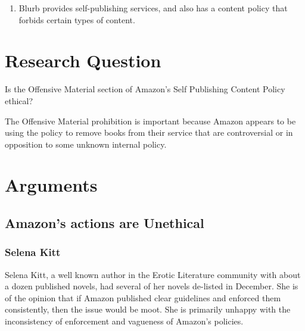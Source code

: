 \documentclass[11pt]{article}
\begin{document}
\begin{multicols}{2}
\begin{itemize}
\begin{enumerate}
   \item Blurb provides self-publishing services, and also has a content policy that forbids certain types of content. \cite{BlurbEULA}
   \end{enumerate}

\end{itemize}

\section{Research Question}

Is the Offensive Material section of Amazon's Self Publishing Content Policy ethical?

The Offensive Material prohibition is important because Amazon appears to be using the policy to remove books from their service that are controversial or in opposition to some unknown internal policy. 


\section{Arguments}

\subsection{Amazon's actions are Unethical}

\subsubsection{Selena Kitt}
Selena Kitt, a well known author in the Erotic Literature community with about a dozen published novels, had several of her novels de-listed in December.  She is of the opinion that if Amazon published clear guidelines and enforced them consistently, then the issue would be moot.  She is primarily unhappy with the inconsistency of enforcement and vagueness of Amazon's policies. \cite{KittSelfPubRevolution}


\end{multicols}
\end{document}

